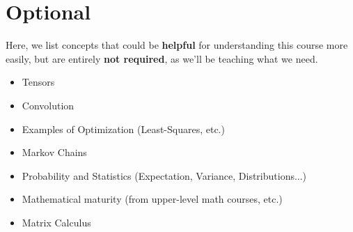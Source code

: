     
\section{Optional}

    Here, we list concepts that could be \textbf{helpful} for understanding this course more easily, but are entirely \textbf{not required}, as we'll be teaching what we need.
    
    \begin{itemize}
        \item Tensors
        \item Convolution
        \item Examples of Optimization (Least-Squares, etc.)
        \item Markov Chains
        \item Probability and Statistics (Expectation, Variance, Distributions...)
        \item Mathematical maturity (from upper-level math courses, etc.)
        \item Matrix Calculus
    \end{itemize}